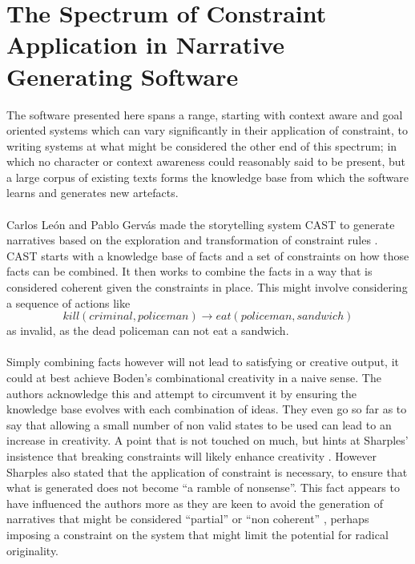 \documentclass[letterpaper]{article}
\begin{document}
\section{The Spectrum of Constraint Application in Narrative Generating Software} \label{sec:spectrum}
The software presented here spans a range, starting with context aware and goal oriented systems which can vary significantly in their application of constraint, to writing systems at what might be considered the other end of this spectrum; in which no character or context awareness could reasonably said to be present, but a large corpus of existing texts forms the knowledge base from which the software learns and generates new artefacts.\\
\\Carlos Le\'on and Pablo Gerv\'as made the storytelling system CAST to generate narratives based on the exploration and transformation of constraint rules \cite{leon2008creative}. CAST starts with a knowledge base of facts and a set of constraints on how those facts can be combined. It then works to combine the facts in a way that is considered coherent given the constraints in place. This might involve considering a sequence of actions like\\
\begin{equation}
kill(criminal, policeman) \rightarrow eat(policeman, sandwich) 
\end{equation}
as invalid, as the dead policeman can not eat a sandwich. \\
\\Simply combining facts however will not lead to satisfying or creative output, it could at best achieve Boden's combinational creativity in a naive sense. The authors acknowledge this and attempt to circumvent it by ensuring the knowledge base evolves with each combination of ideas. They even go so far as to say that allowing a small number of non valid states to be used can lead to an increase in creativity. A point that is not touched on much, but hints at Sharples' insistence that breaking constraints will likely enhance creativity \cite{Sharples96anaccount}. However Sharples also stated that the application of constraint is necessary, to ensure that what is generated does not become \enquote{a ramble of nonsense}. This fact appears to have influenced the authors more as they are keen to avoid the generation of narratives that might be considered \enquote{partial} or \enquote{non coherent} \cite{leon2008creative}, perhaps imposing a constraint on the system that might limit the potential for radical originality.\\
\end{document}
